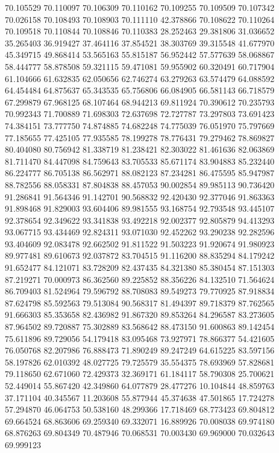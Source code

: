 70.105529
70.110097
70.106309
70.110162
70.109255
70.109509
70.107342
70.026158
70.108493
70.108903
70.111110
42.378866
70.108622
70.110264
70.109518
70.110844
70.108846
70.110383
28.252463
29.381806
31.036652
35.265403
36.919427
37.464116
37.854521
38.303769
39.315548
41.677970
45.349715
49.868414
53.565163
55.815187
56.952442
57.577639
58.068867
58.444777
58.878508
59.321115
59.471081
59.955902
60.320491
60.717904
61.104666
61.632835
62.050656
62.746274
63.279263
63.574479
64.088592
64.454484
64.875637
65.343535
65.756806
66.084905
66.581143
66.718579
67.299879
67.968125
68.107464
68.944213
69.811924
70.390612
70.235793
70.992343
71.700889
71.698303
72.637698
72.727787
73.297803
73.691423
74.384151
73.777750
74.874885
74.682248
74.775039
76.051970
75.797669
77.185655
77.425105
77.935585
78.199278
78.776431
79.279462
78.869827
80.404080
80.756942
81.338719
81.238421
82.303022
81.461636
82.063869
81.711470
84.447098
84.759643
83.705533
85.671174
83.904883
85.232440
86.224777
86.705138
86.562971
88.082123
87.234281
86.475595
85.947987
88.782556
88.058331
87.804838
88.457053
90.002854
89.985113
90.736420
91.286841
91.564346
91.142701
90.568832
92.420430
92.377046
91.863363
91.898468
91.829003
93.604406
89.981555
93.168754
92.793548
93.445107
92.378654
92.349622
93.341838
93.492218
92.002377
92.805879
94.413293
93.067715
93.434469
92.824311
93.071030
92.452262
93.290238
92.282596
93.404609
92.083478
92.662502
91.811522
91.503223
91.920674
91.980923
89.977481
89.610673
92.037872
83.704515
91.116200
88.835294
84.179242
91.652477
84.121071
83.728209
82.437435
84.321380
85.380454
87.151303
87.219271
70.000973
86.362560
89.225852
88.356226
84.132510
71.564624
86.709403
81.524964
79.596792
88.708083
89.549273
79.770925
87.918834
87.624798
85.592563
79.513084
90.568317
81.494397
89.718379
87.762565
91.666303
85.353658
82.436982
91.867320
89.853264
84.296587
83.273605
87.964502
89.720887
75.302889
83.568642
88.473150
91.600863
89.142454
75.611896
89.729056
54.179418
83.095468
73.927971
78.866377
54.421605
76.050768
82.207986
76.888473
71.890249
89.247249
64.615225
83.597156
58.197826
62.010392
48.027725
79.725579
35.554375
78.693969
57.828681
79.118650
62.671060
72.429373
32.369171
61.184117
58.790308
25.700621
52.449014
55.867420
42.349860
64.077879
28.477276
10.104844
48.859763
37.171104
40.345567
11.203608
55.877944
45.374638
47.501865
17.724278
57.294870
46.064753
50.538160
48.299366
17.718469
68.773423
69.804812
69.664524
68.863606
69.259340
69.332071
16.889926
70.008038
69.974180
68.876263
69.804349
70.487946
70.068531
70.003430
69.969000
70.032643
69.999123
